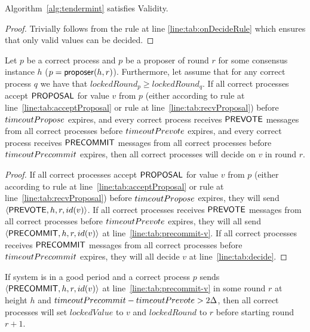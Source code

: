 \begin{lemma}
	\label{lemma:agreement}
	Algorithm~\ref{alg:tendermint} satisfies Validity. 
\end{lemma}

\begin{proof}
Trivially follows from the rule at line \ref{line:tab:onDecideRule} which ensures that only valid values can be decided. 
\end{proof}	

\begin{lemma}
	\label{lemma:correct_proposer}
Let $p$ be a correct process and $p$ be a proposer of round $r$ for some consensus instance $h$ ($p = \mathsf{proposer}(h, r)$). Furthermore, let assume that for any correct process $q$ we have that $lockedRound_p \ge lockedRound_q$. If all correct processes accept $\mathsf{PROPOSAL}$ for value $v$ from $p$ (either according to rule at line~\ref{line:tab:acceptProposal} or rule at line~\ref{line:tab:recvProposal}) before $timeoutPropose$ expires, and every correct process receives $\mathsf{PREVOTE}$ messages from all correct processes before $timeoutPrevote$ expires, and every correct process receives $\mathsf{PRECOMMIT}$ messages from all correct processes before $timeoutPrecommit$ expires, then all correct processes will decide on $v$ in round $r$.     
\end{lemma}

\begin{proof}
If all correct processes accept $\mathsf{PROPOSAL}$ for value $v$ from $p$ (either according to rule at line~\ref{line:tab:acceptProposal} or rule at line~\ref{line:tab:recvProposal}) before $timeoutPropose$ expires, they will send $\langle\mathsf{PREVOTE},h,r,id(v)\rangle$. If all correct processes receives $\mathsf{PREVOTE}$ messages from all correct processes before $timeoutPrevote$ expires, they will all send $\langle\mathsf{PRECOMMIT},h,r,id(v)\rangle$ at line~\ref{line:tab:precommit-v}. If all correct processes receives $\mathsf{PRECOMMIT}$ messages from all correct processes before $timeoutPrecommit$ expires, they will all decide $v$ at line~\ref{line:tab:decide}.
\end{proof}

\begin{lemma}
	\label{lemma:validValue}
If system is in a good period and a correct process $p$ sends $\langle\mathsf{PRECOMMIT},h,r,id(v)\rangle$ at line~\ref{line:tab:precommit-v} in some round $r$ at height $h$ and $timeoutPrecommit - timeoutPrevote > 2\Delta$, then all correct processes will set $lockedValue$ to $v$ and $lockedRound$ to $r$ before starting round $r+1$. 
\end{lemma}
 
